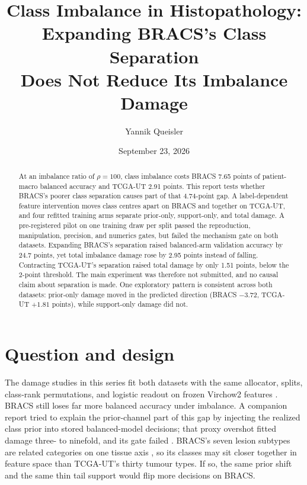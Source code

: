 \documentclass[11pt]{article}
\title{Class Imbalance in Histopathology:\\Expanding {BRACS}'s Class Separation\\Does Not Reduce Its Imbalance Damage}
\author{Yannik Queisler}
\date{September 23, 2026}
\begin{document}
\raggedbottom
{}
\setlength{\emergencystretch}{2em}
\maketitle
\begin{abstract}
\noindent At an imbalance ratio of $\rho=100$, class imbalance costs BRACS 7.65 points of patient-macro balanced accuracy and TCGA-UT 2.91 points. This report tests whether BRACS's poorer class separation causes part of that 4.74-point gap. A label-dependent feature intervention moves class centres apart on BRACS and together on TCGA-UT, and four refitted training arms separate prior-only, support-only, and total damage. A pre-registered pilot on one training draw per split passed the reproduction, manipulation, precision, and numerics gates, but failed the mechanism gate on both datasets. Expanding BRACS's separation raised balanced-arm validation accuracy by 24.7 points, yet total imbalance damage rose by 2.95 points instead of falling. Contracting TCGA-UT's separation raised total damage by only 1.51 points, below the 2-point threshold. The main experiment was therefore not submitted, and no causal claim about separation is made. One exploratory pattern is consistent across both datasets: prior-only damage moved in the predicted direction (BRACS $-3.72$, TCGA-UT $+1.81$ points), while support-only damage did not.
\end{abstract}

\section{Question and design}
\label{sec:design}
The damage studies in this series fit both datasets with the same allocator, splits, class-rank permutations, and logistic readout on frozen Virchow2 features \citep{queisler2026prevalenceTcga, queisler2026prevalenceBracs, zimmermann2024virchow2}. BRACS still loses far more balanced accuracy under imbalance. A companion report tried to explain the prior-channel part of this gap by injecting the realized class prior into stored balanced-model decisions; that proxy overshot fitted damage three- to ninefold, and its gate failed \citep{queisler2026marginTcgaBracs}. BRACS's seven lesion subtypes are related categories on one tissue axis \citep{brancati2022bracs}, so its classes may sit closer together in feature space than TCGA-UT's thirty tumour types. If so, the same prior shift and the same thin tail support would flip more decisions on BRACS.
\end{document}
